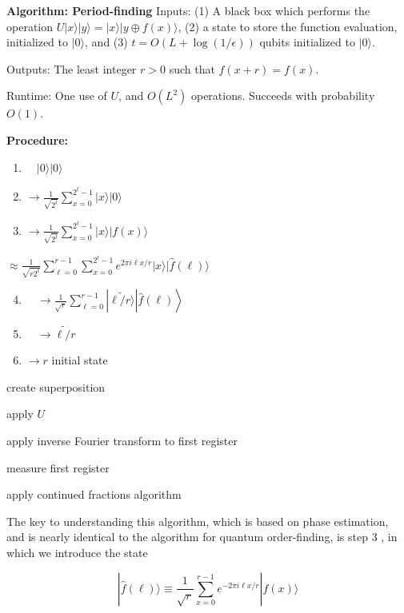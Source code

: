 \textbf{Algorithm: Period-finding}
Inputs: (1) A black box which performs the operation $U|x\rangle|y\rangle=|x\rangle|y \oplus f(x)\rangle$, (2) a state to store the function evaluation, initialized to $|0\rangle$, and (3) $t=O(L+\log (1 / \epsilon))$ qubits initialized to $|0\rangle$.

Outputs: The least integer $r>0$ such that $f(x+r)=f(x)$.

Runtime: One use of $U$, and $O\left(L^{2}\right)$ operations. Succeeds with probability $O(1)$.

\textbf{Procedure:}
\begin{enumerate}
  \item $\quad|0\rangle|0\rangle$

  \item $\rightarrow \frac{1}{\sqrt{2^{t}}} \sum_{x=0}^{2^{t}-1}|x\rangle|0\rangle$

  \item $\rightarrow \frac{1}{\sqrt{2^{t}}} \sum_{x=0}^{2^{t}-1}|x\rangle|f(x)\rangle$

\end{enumerate}

$\approx \frac{1}{\sqrt{r 2^{t}}} \sum_{\ell=0}^{r-1} \sum_{x=0}^{2^{t}-1} e^{2 \pi i \ell x / r}|x\rangle|\hat{f}(\ell)\rangle$

\begin{enumerate}
  \setcounter{enumi}{3}
  \item $\left.\quad \rightarrow \frac{1}{\sqrt{r}} \sum_{\ell=0}^{r-1}|\widetilde{\ell / r\rangle}| \hat{f}(\ell)\right\rangle$

  \item $\quad \rightarrow \widetilde{\ell / r}$

  \item $\rightarrow r$ initial state

\end{enumerate}

create superposition

apply $U$

apply inverse Fourier transform to first register

measure first register

apply continued fractions algorithm

The key to understanding this algorithm, which is based on phase estimation, and is nearly identical to the algorithm for quantum order-finding, is step 3 , in which we introduce the state

\begin{equation*}
|\hat{f}(\ell)\rangle \equiv \frac{1}{\sqrt{r}} \sum_{x=0}^{r-1} e^{-2 \pi i \ell x / r}|f(x)\rangle \tag{5.63}
\end{equation*}

